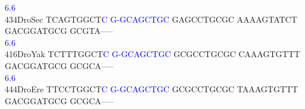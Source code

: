 \documentclass[11pt,twoside,reqno,a4paper]{article}
\begin{document}
{\hspace*{4\charwidth}\hspace*{7\charwidth}\hspace*{9\charwidth}\textcolor{Blue}{6.6}\hspace*{1\charwidth}\hspace*{1\charwidth}\hspace*{1\charwidth}\hspace*{1\charwidth}\hspace*{1\charwidth}\hspace*{1\charwidth}\\
434\hspace*{1\charwidth}DroSec	TCAGTGGCT\textcolor{Blue}{C}	\textcolor{Blue}{G}\textcolor{Blue}{-}\textcolor{Blue}{G}\textcolor{Blue}{C}\textcolor{Blue}{A}\textcolor{Blue}{G}\textcolor{Blue}{C}\textcolor{Blue}{T}\textcolor{Blue}{G}\textcolor{Blue}{C}	GAGCCTGCGC	AAAAGTATCT	GACGGATGCG	GCGTA-----	\\
\hspace*{4\charwidth}\hspace*{7\charwidth}\hspace*{9\charwidth}\textcolor{Blue}{6.6}\hspace*{1\charwidth}\hspace*{1\charwidth}\hspace*{1\charwidth}\hspace*{1\charwidth}\hspace*{1\charwidth}\hspace*{1\charwidth}\\
416\hspace*{1\charwidth}DroYak	TCTTTGGCT\textcolor{Blue}{C}	\textcolor{Blue}{G}\textcolor{Blue}{-}\textcolor{Blue}{G}\textcolor{Blue}{C}\textcolor{Blue}{A}\textcolor{Blue}{G}\textcolor{Blue}{C}\textcolor{Blue}{T}\textcolor{Blue}{G}\textcolor{Blue}{C}	GCGCCTGCGC	CAAAGTGTTT	GACGGATGCG	GCGCA-----	\\
\hspace*{4\charwidth}\hspace*{7\charwidth}\hspace*{9\charwidth}\textcolor{Blue}{6.6}\hspace*{1\charwidth}\hspace*{1\charwidth}\hspace*{1\charwidth}\hspace*{1\charwidth}\hspace*{1\charwidth}\hspace*{1\charwidth}\\
444\hspace*{1\charwidth}DroEre	TTCCTGGCT\textcolor{Blue}{C}	\textcolor{Blue}{G}\textcolor{Blue}{-}\textcolor{Blue}{G}\textcolor{Blue}{C}\textcolor{Blue}{A}\textcolor{Blue}{G}\textcolor{Blue}{C}\textcolor{Blue}{T}\textcolor{Blue}{G}\textcolor{Blue}{C}	GCGCCTGCGC	TAAAGTGTTT	GACGGATGCG	GCGCA-----	\\
}
\end{document}
